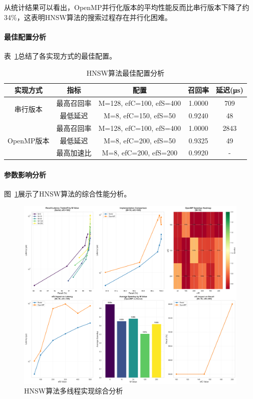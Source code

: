 从统计结果可以看出，OpenMP并行化版本的平均性能反而比串行版本下降了约34\%，这表明HNSW算法的搜索过程存在并行化困难。

\paragraph{最佳配置分析}

表~\ref{tab:hnsw_best_configs}总结了各实现方式的最佳配置。

\begin{table}[htbp]
\centering
\caption{HNSW算法最佳配置分析}
\label{tab:hnsw_best_configs}
\begin{tabular}{|c|c|c|c|c|}
\hline
\textbf{实现方式} & \textbf{指标} & \textbf{配置} & \textbf{召回率} & \textbf{延迟(μs)} \\
\hline
\multirow{2}{*}{串行版本} & 最高召回率 & M=128, efC=100, efS=400 & 1.0000 & 709 \\
& 最低延迟 & M=8, efC=150, efS=50 & 0.9240 & 48 \\
\hline
\multirow{3}{*}{OpenMP版本} & 最高召回率 & M=128, efC=100, efS=400 & 1.0000 & 2843 \\
& 最低延迟 & M=8, efC=200, efS=50 & 0.9325 & 49 \\
& 最高加速比 & M=8, efC=200, efS=200 & 0.9920 & - \\
\hline
\end{tabular}
\end{table}

\paragraph{参数影响分析}

图~\ref{fig:hnsw_comprehensive}展示了HNSW算法的综合性能分析。

\begin{figure}[htbp]
\centering
\includegraphics[width=\textwidth]{plots/hnsw_comprehensive_analysis_en.png}
\caption{HNSW算法多线程实现综合分析}
\label{fig:hnsw_comprehensive}
\end{figure}

